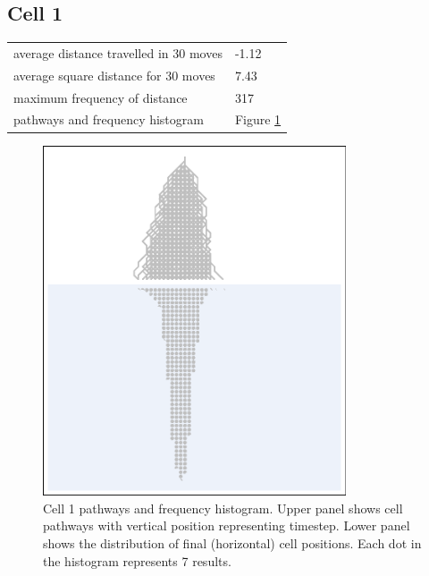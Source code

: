 \documentclass[11pt,a4paper]{article}
\newcommand \bt{\begin{longtable}{p{0.65\textwidth}p{0.25\textwidth}}}
\newcommand \et{\end{longtable}}
\begin{document}
\subsection*{Cell 1}
\bt
average distance travelled in 30 moves &  -1.12\\
average square distance for 30 moves & 7.43\\
maximum frequency of distance & 317\\
pathways and frequency histogram & Figure \ref{fig1}
\et
\begin{figure}[htbp]
\begin{center}
\includegraphics[width=0.8\textwidth]{CA30_R40L40_1.eps}
\caption{Cell 1 pathways and frequency histogram. Upper panel shows cell pathways with vertical position representing timestep. 
Lower panel shows the distribution of final (horizontal) cell positions. Each dot in the histogram represents 7 results.}
\label{fig1}
\end{center}
\end{figure}
\end{document}
